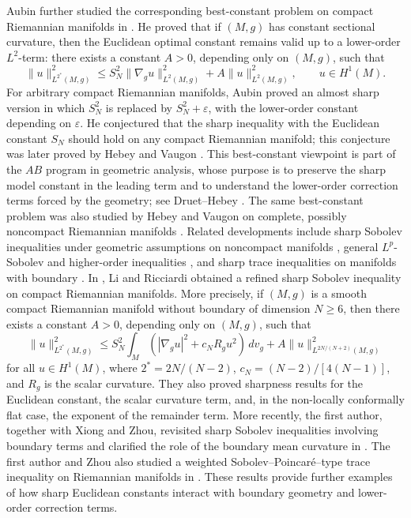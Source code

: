 \documentclass[11pt]{article}
\numberwithin{equation}{section}
\newcounter{problem}
\numberwithin{equation}{section}
\begin{document}
	Aubin further studied the corresponding best-constant problem on compact Riemannian manifolds in \cite{A1976}. He proved that if \((M,g)\) has constant sectional curvature, then the Euclidean optimal constant remains valid up to a lower-order \(L^2\)-term: there exists a constant \(A>0\), depending only on \((M,g)\), such that
	\[
	\|u\|_{L^{2^*}(M,g)}^2 \le S_N^2\|\nabla_g u\|_{L^2(M,g)}^2 + A\|u\|_{L^2(M,g)}^2, \qquad u\in H^1(M).
	\]
	For arbitrary compact Riemannian manifolds, Aubin \cite{A1976} proved an almost sharp version in which \(S_N^2\) is replaced by \(S_N^2 + \varepsilon\), with the lower-order constant depending on \(\varepsilon\). He conjectured that the sharp inequality with the Euclidean constant \(S_N\) should hold on any compact Riemannian manifold; this conjecture was later proved by Hebey and Vaugon \cite{HV1996}. This best-constant viewpoint is part of the \(AB\) program in geometric analysis, whose purpose is to preserve the sharp model constant in the leading term and to understand the lower-order correction terms forced by the geometry; see Druet--Hebey \cite{DH2002}. The same best-constant problem was also studied by Hebey and Vaugon on complete, possibly noncompact Riemannian manifolds \cite{HV1995}. Related developments include sharp Sobolev inequalities under geometric assumptions on noncompact manifolds \cite{S1992,L1999,C1994}, general \(L^p\)-Sobolev and higher-order inequalities \cite{H1996,H1999,D1998}, and sharp trace inequalities on manifolds with boundary \cite{E1998,E1992,LZ1997,LZ1998}. In \cite{LR2003}, Li and Ricciardi obtained a refined sharp Sobolev inequality on compact Riemannian manifolds. More precisely, if \((M,g)\) is a smooth compact Riemannian manifold without boundary of dimension \(N\geq 6\), then there exists a constant \(A>0\), depending only on \((M,g)\), such that
	\[
	\|u\|_{L^{2^*}(M,g)}^2 \le S_N^2\int_M(|\nabla_g u|^2+c_N R_g u^2)\,dv_g + A\|u\|_{L^{2N/(N+2)}(M,g)}^2
	\]
	for all \(u\in H^1(M)\), where \(2^*=2N/(N-2)\), \(c_N=(N-2)/[4(N-1)]\), and \(R_g\) is the scalar curvature. They also proved sharpness results for the Euclidean constant, the scalar curvature term, and, in the non-locally conformally flat case, the exponent of the remainder term. More recently, the first author, together with Xiong and Zhou, revisited sharp Sobolev inequalities involving boundary terms and clarified the role of the boundary mean curvature in \cite{TXZ2021}. The first author and Zhou also studied a weighted Sobolev--Poincar\'e--type trace inequality on Riemannian manifolds in \cite{TZ2026}. These results provide further examples of how sharp Euclidean constants interact with boundary geometry and lower-order correction terms.
	
\end{document}
